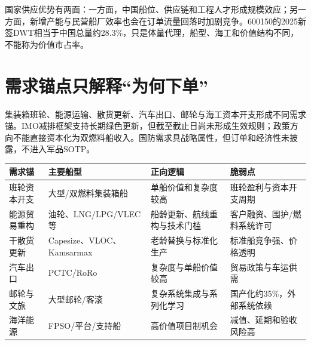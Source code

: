 \begin{exhibitbox}[中国造船三大指标]
\centering
{}
\end{exhibitbox}

国家供应优势有两面：一方面，中国船位、供应链和工程人才形成规模效应；另一方面，新增产能与民营船厂效率也会在订单流量回落时加剧竞争。600150的2025新签DWT相当于中国总量约28.3\%，只是体量代理，船型、海工和价值结构不同，不能称为价值市占率。

\section{需求锚点只解释“为何下单”}

集装箱班轮、能源运输、散货更新、汽车出口、邮轮与海工资本开支形成不同需求锚。IMO减排框架支持长期绿色更新，但截至截止日尚未形成生效规则；政策方向不能直接资本化为双燃料船收入。国防需求具战略属性，但订单和经济性未披露，不进入军品SOTP。

\begin{exhibitbox}
\small
\begin{tabularx}{\exhibitboxwidth}{L{2.8cm}L{3.4cm}L{3.4cm}X}
\toprule
\textbf{需求锚} & \textbf{主要船型} & \textbf{正向逻辑} & \textbf{脆弱点} \\
\midrule
班轮资本开支 & 大型/双燃料集装箱船 & 单船价值和复杂度较高 & 班轮盈利与资本开支周期 \\
能源贸易重构 & 油轮、LNG/LPG/VLEC等 & 船龄更新、航线重构与技术门槛 & 客户融资、围护/燃料系统许可 \\
干散货更新 & Capesize、VLOC、Kamsarmax & 老龄替换与标准化生产 & 标准船竞争强、价格透明 \\
汽车出口 & PCTC/RoRo & 复杂度与单船价值较高 & 贸易政策与车运供需 \\
邮轮与文旅 & 大型邮轮/客滚 & 复杂系统集成与系列化学习 & 国产化约35\%，外部系统依赖 \\
海洋能源 & FPSO/平台/支持船 & 高价值项目制机会 & 减值、延期和验收风险高 \\
\bottomrule
\end{tabularx}
\end{exhibitbox}

